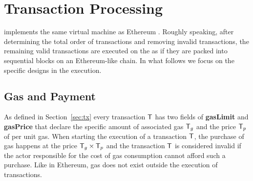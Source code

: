 

\section{Transaction Processing}
\label{sec:tx_processing}

\name implements the same virtual machine as Ethereum \cite{ETH_yellow}. 
Roughly speaking, after determining the total order of transactions and removing invalid transactions, the remaining valid transactions are executed on the \cvm as if they are packed into sequential blocks on an Ethereum-like chain.
In what follows we focus on the \name specific designs in the execution.

\subsection{Gas and Payment}
\label{subsec:gas_and_pay}

As defined in Section~\ref{sec:tx} every transaction $\textsf{T}$ has two fields of {\bf gasLimit} and {\bf gasPrice} that declare the specific amount of associated gas $\textsf{T}_g$ and the price $\textsf{T}_p$ of per unit gas.
When starting the execution of a transaction $\textsf{T}$, the purchase of gas happens at the price $\textsf{T}_g \times \textsf{T}_p$ and the transaction $\textsf{T}$ is considered invalid if the actor responsible for the cost of gas consumption cannot afford such a purchase.
Like in Ethereum, gas does not exist outside the execution of transactions.


